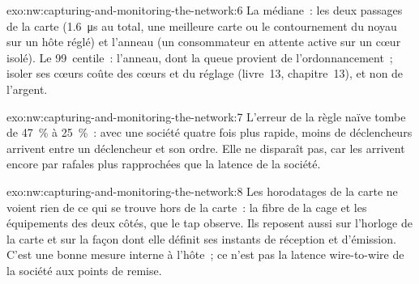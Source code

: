 \begin{solution}{exo:nw:capturing-and-monitoring-the-network:6}
La médiane~: les deux passages de la carte (1.6~\unit{\micro\second} au total, une meilleure carte ou le contournement du noyau sur un hôte réglé) et l'anneau
(un consommateur en attente active sur un cœur isolé). Le 99~centile~: l'anneau, dont la queue provient de l'ordonnancement~; isoler ses cœurs coûte
des cœurs et du réglage (livre~13, chapitre~13), et non de l'argent.
\end{solution}

\begin{solution}{exo:nw:capturing-and-monitoring-the-network:7}
L'erreur de la règle naïve tombe de 47~\% à 25~\%~: avec une société quatre fois plus rapide, moins de déclencheurs arrivent entre un déclencheur et son ordre. Elle ne disparaît pas,
car les  arrivent encore par rafales plus rapprochées que la latence de la société.
\end{solution}

\begin{solution}{exo:nw:capturing-and-monitoring-the-network:8}
Les horodatages de la carte ne voient rien de ce qui se trouve hors de la carte~: la fibre de la cage et les équipements des deux côtés, que le tap observe. Ils reposent aussi sur
l'horloge de la carte et sur la façon dont elle définit ses instants de réception et d'émission. C'est une bonne mesure interne à l'hôte~; ce n'est pas la latence wire-to-wire
de la société aux points de remise.
\end{solution}

